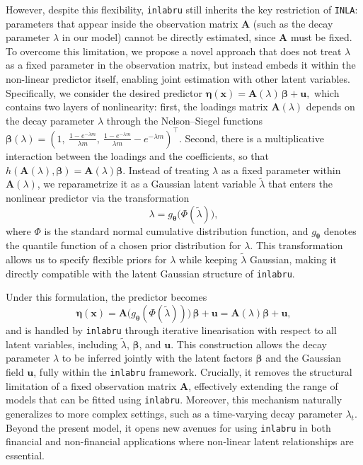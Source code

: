 \documentclass[
  12pt]{article}
\begin{document}
However, despite this flexibility, \texttt{inlabru} still inherits the key restriction of \texttt{INLA}: parameters that appear inside the observation matrix $\boldsymbol{A}$ (such as the decay parameter $\lambda$ in our model) cannot be directly estimated, since $\boldsymbol{A}$ must be fixed. To overcome this limitation, we propose a novel approach that does not treat $\lambda$ as a fixed parameter in the observation matrix, but instead embeds it within the non-linear predictor itself, enabling joint estimation with other latent variables. Specifically, we consider the desired predictor $\boldsymbol{\eta}(\boldsymbol{x}) = \boldsymbol{A}(\lambda)\,\boldsymbol{\beta} + \boldsymbol{u},$ which contains two layers of nonlinearity:
first, the loadings matrix $\boldsymbol{A}(\lambda)$ depends on the decay parameter $\lambda$ through the Nelson–Siegel functions $\boldsymbol{\beta}(\lambda) = (1, \ \frac{1 - e^{-\lambda m}}{\lambda m}, \ \frac{1 - e^{-\lambda m}}{\lambda m} - e^{-\lambda m})^\top.$ Second, there is a multiplicative interaction between the loadings and the coefficients, so that $h(\boldsymbol{A}(\lambda), \boldsymbol{\beta}) = \boldsymbol{A}(\lambda)\boldsymbol{\beta}$. Instead of treating $\lambda$ as a fixed parameter within $\boldsymbol{A}(\lambda)$, we reparametrize it as a Gaussian latent variable $\tilde{\lambda}$ that enters the nonlinear predictor via the transformation
\[
\lambda = g_{\boldsymbol{\theta}}\bigl(\Phi(\tilde{\lambda})\bigr),
\]
where $\Phi$ is the standard normal cumulative distribution function, and $g_{\boldsymbol{\theta}}$ denotes the quantile function of a chosen prior distribution for $\lambda$. This transformation allows us to specify flexible priors for $\lambda$ while keeping $\tilde{\lambda}$ Gaussian, making it directly compatible with the latent Gaussian structure of \texttt{inlabru}.

Under this formulation, the predictor becomes
\[
\boldsymbol{\eta}(\boldsymbol{x}) = \boldsymbol{A}\bigl(g_{\boldsymbol{\theta}}(\Phi(\tilde{\lambda}))\bigr)\,\boldsymbol{\beta} + \boldsymbol{u} = \boldsymbol{A}(\lambda)\boldsymbol{\beta} + \boldsymbol{u},
\]
and is handled by \texttt{inlabru} through iterative linearisation with respect to all latent variables, including $\tilde{\lambda}$, $\boldsymbol{\beta}$, and $\boldsymbol{u}$. This construction allows the decay parameter $\lambda$ to be inferred jointly with the latent factors $\boldsymbol{\beta}$ and the Gaussian field $\boldsymbol{u}$, fully within the \texttt{inlabru} framework. Crucially, it removes the structural limitation of a fixed observation matrix $\boldsymbol{A}$, effectively extending the range of models that can be fitted using \texttt{inlabru}. Moreover, this mechanism naturally generalizes to more complex settings, such as a time-varying decay parameter $\lambda_t$. Beyond the present model, it opens new avenues for using \texttt{inlabru} in both financial and non-financial applications where non-linear latent relationships are essential. 
\end{document}
